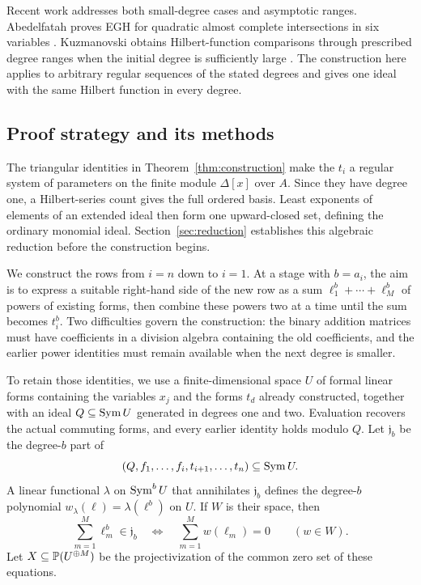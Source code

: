 Recent work addresses both small-degree cases and asymptotic ranges.
Abedelfatah proves EGH for quadratic almost complete intersections in
six variables \cite[Theorem~4.3]{Abedelfatah26}. Kuzmanovski obtains
Hilbert-function comparisons through prescribed degree ranges when the
initial degree is sufficiently large
\cite[Theorems~1.4--1.5]{Kuzmanovski26}. The construction here applies to
arbitrary regular sequences of the stated degrees and gives one ideal
with the same Hilbert function in every degree.

\subsection{Proof strategy and its methods}

The triangular identities in Theorem~\ref{thm:construction} make the
\(t_i\) a regular system of parameters on the finite module
\(\Delta[x]\) over \(A\). Since they have degree one, a Hilbert-series
count gives the full ordered basis. Least exponents of elements of an
extended ideal then form one upward-closed set, defining the ordinary
monomial ideal. Section~\ref{sec:reduction} establishes this algebraic
reduction before the construction begins.

We construct the rows from \(i=n\) down to \(i=1\). At a stage with
\(b=a_i\), the aim is to express a suitable right-hand side of the new
row as a sum \(\ell_1^b+\cdots+\ell_M^b\) of powers of existing forms,
then combine these powers two at a time until the sum becomes \(t_i^b\).
Two difficulties govern the construction: the binary addition matrices
must have coefficients in a division algebra containing the old
coefficients, and the earlier power identities must remain available
when the next degree is smaller.

To retain those identities, we use a finite-dimensional space \(U\)
of formal linear forms containing the variables \(x_j\) and the forms
\(t_d\) already constructed, together with an ideal
\(Q\subseteq\operatorname{Sym} U\) generated in degrees one and two. Evaluation
recovers the actual commuting forms, and every earlier identity holds
modulo \(Q\). Let \(\mathfrak j_b\) be the degree-\(b\) part of
\[
 (Q,f_1,\ldots,f_i,t_{i+1},\ldots,t_n)\subseteq\operatorname{Sym} U.
\]
A linear functional \(\lambda\) on \(\operatorname{Sym}^b U\) that annihilates
\(\mathfrak j_b\) defines the
degree-\(b\) polynomial \(w_\lambda(\ell)=\lambda(\ell^b)\) on \(U\).
If \(W\) is their space, then
\[
 \sum_{m=1}^M\ell_m^b\in\mathfrak j_b
 \quad\Longleftrightarrow\quad
 \sum_{m=1}^M w(\ell_m)=0\qquad(w\in W).
\]
Let \(X\subseteq\mathbb P(U^{\oplus M})\) be the projectivization of the
common zero set of these equations.

